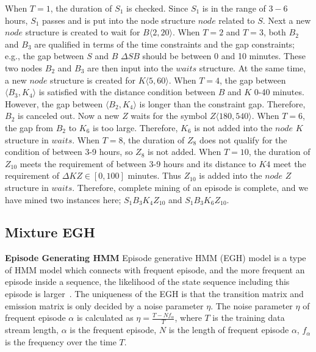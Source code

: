 When $T=1$, the duration of $S_1$ is checked. 
Since $S_1$ is in the range of $3-6$ hours, 
$S_1$ passes and is put into the node structure $node$ related to $S$. 
Next a new $node$ structure is created to wait for $B\langle 2, 20 \rangle $. 
When $T=2$ and $T=3$, both $B_2$ and $B_3$ 
are qualified in terms of the time constraints and 
the gap constraints; 
e.g., the gap between $S$ and $B$ $\Delta SB$ should 
be between 0 and 10 minutes. 
These two nodes $B_2$ and $B_3$ are then input into the 
$waits$ structure. 
At the same time, 
a new $node$ structure is created for $K\langle 5, 60 \rangle $. 
When $T=4$, the gap between $\langle B_3, K_4 \rangle$ 
is satisfied with the distance condition between 
$B$ and $K$ 0-40 minutes. 
However, the gap between $\langle B_2, K_4 \rangle$ 
is longer than the constraint gap. 
Therefore, $B_2$ is canceled out. 
Now a new $Z$ waits for the symbol $Z\langle 180, 540 \rangle$. 
When $T=6$, the gap from $B_2$ to $K_6$ is 
too large. Therefore, $K_6$ is not added into the $node$ $K$ structure in $waits$.
When $T=8$, the duration of $Z_8$ does not qualify for the condition of between 3-9 hours,  
so $Z_8$ is not added. 
When $T=10$, the duration of $Z_{10}$ meets the requirement of between 3-9 hours 
and its distance to $K4$ meet the requirement 
of $\Delta KZ \in [0,100]$ minutes. 
Thus $Z_{10}$ is added into the $node$ $Z$ structure in $waits$.
Therefore, complete mining of an episode is complete, and 
we have mined two instances here; $S_1B_3K_4Z_{10}$ and $S_1B_3K_6Z_{10}$. 


\subsection{Mixture EGH}
\textbf{Episode Generating HMM}
Episode generative HMM (EGH) model is a 
type of HMM model which connects with frequent episode, 
and the more frequent an episode inside a sequence, 
the likelihood of the state sequence including this episode is larger~\cite{laxman2008stream}.  
The uniqueness of the EGH is that 
the transition matrix and 
emission matrix is only decided by a noise parameter $\eta$. 
The noise parameter $\eta$ of frequent episode $\alpha$ 
is calculated as $\eta=\frac{T-Nf_{\alpha}}{T}$,  
where $T$ is the training data stream length, 
$\alpha$ is the frequent episode, 
$N$ is the length of frequent episode $\alpha$, 
$f_{\alpha}$ is the frequency over the time $T$.

